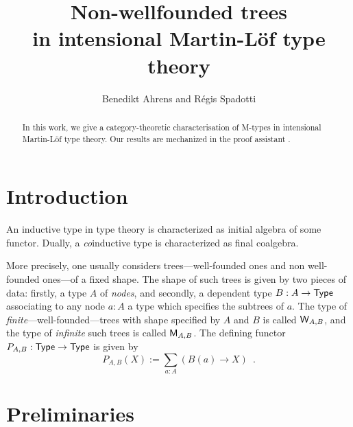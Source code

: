 \documentclass[envcountsame]{llncs}
\begin{document}
\title{Non-wellfounded trees\\in intensional Martin-L\"of type theory}

\author{Benedikt Ahrens and R\'egis Spadotti}


\newcommand{\fat}[1]{\textbf{#1}}
\newcommand{\M}{\constfont{M}}
\newcommand{\W}{\constfont{W}}
\renewcommand{\root}{\constfont{root}}
\newcommand{\br}{\constfont{br}}
\newcommand{\transport}{\constfont{transport}}


\maketitle


\begin{abstract}


 In this work, we give a category-theoretic characterisation of \textsf{M}-types in intensional Martin-L\"of type theory.
 Our results are mechanized in the proof assistant \coq.
   
  
  \end{abstract}


\section{Introduction}



An inductive type in type theory is characterized as initial algebra of some functor.
Dually, a \emph{co}inductive type is characterized as final coalgebra.

More precisely, one usually considers trees---well-founded ones and non well-founded ones---of a fixed shape.
The shape of such trees is given by two pieces of data: firstly, a type $A$ of \emph{nodes}, and secondly,
a dependent type $B : A \to \mathsf{Type}$ associating to any node $a : A$ a type which specifies the subtrees of $a$.
The type of \emph{finite}---well-founded---trees with shape specified by $A$ and $B$ is called $\W_{A,B}$,
and the type of \emph{infinite} such trees is called $\M_{A,B}$.
The defining functor $P_{A,B} : \mathsf{Type} \to \mathsf{Type}$ is given by 
\[ P_{A,B}(X) := \sum_{a:A}\left(B(a) \to X\right) \enspace . \]



\section{Preliminaries}\label{sec:preliminaries}
\end{document}
